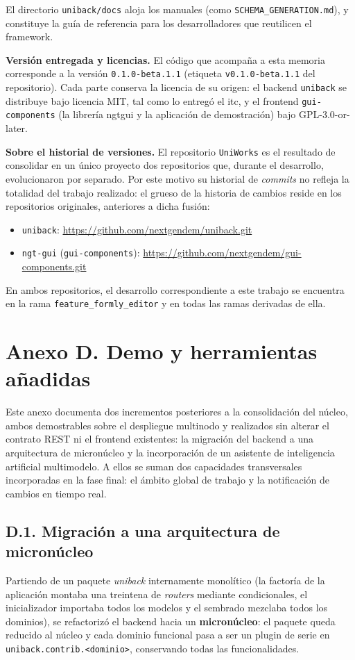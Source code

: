 El directorio \texttt{uniback/docs} aloja los manuales (como \texttt{SCHEMA\_GENERATION.md}), y constituye la guía de referencia para los
desarrolladores que reutilicen el framework.

\textbf{Versión entregada y licencias.} El código que acompaña a esta memoria
corresponde a la versión \texttt{0.1.0-beta.1.1} (etiqueta
\texttt{v0.1.0-beta.1.1} del repositorio). Cada parte conserva la licencia de su
origen: el backend \texttt{uniback} se distribuye bajo licencia MIT, tal como
lo entregó el \gls{itc}, y el frontend \texttt{gui-components} (la librería
\gls{ngtgui} y la aplicación de demostración) bajo GPL-3.0-or-later.

\textbf{Sobre el historial de versiones.} El repositorio \texttt{UniWorks} es el
resultado de consolidar en un único proyecto dos repositorios que, durante el
desarrollo, evolucionaron por separado. Por este motivo su historial de
\emph{commits} no refleja la totalidad del trabajo realizado: el grueso de la
historia de cambios reside en los repositorios originales, anteriores a dicha
fusión:

\begin{itemize}
  \item \texttt{uniback}: \url{https://github.com/nextgendem/uniback.git}
  \item \texttt{ngt-gui} (\texttt{gui-components}): \url{https://github.com/nextgendem/gui-components.git}
\end{itemize}

En ambos repositorios, el desarrollo correspondiente a este trabajo se encuentra
en la rama \texttt{feature\_formly\_editor} y en todas las ramas derivadas de
ella.

\section{Anexo D. Demo y herramientas añadidas}
Este anexo documenta dos incrementos posteriores a la consolidación del
núcleo, ambos demostrables sobre el despliegue multinodo y realizados sin
alterar el contrato REST ni el frontend existentes: la migración del backend a
una arquitectura de micronúcleo y la incorporación de un asistente de
inteligencia artificial multimodelo. A ellos se suman dos capacidades
transversales incorporadas en la fase final: el ámbito global de trabajo y la
notificación de cambios en tiempo real.

\subsection{D.1. Migración a una arquitectura de micronúcleo}
Partiendo de un paquete \emph{uniback} internamente monolítico (la factoría de
la aplicación montaba una treintena de \emph{routers} mediante condicionales,
el inicializador importaba todos los modelos y el sembrado mezclaba todos los
dominios), se refactorizó el backend hacia un \textbf{micronúcleo}: el paquete
queda reducido al núcleo y cada dominio funcional pasa a ser un plugin de serie
en \texttt{uniback.contrib.<dominio>}, conservando todas las funcionalidades.

